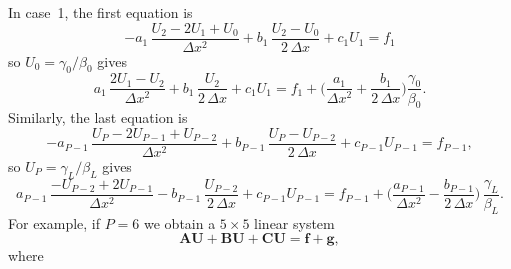 In case~1, the first equation is
\[
-a_1\,\frac{U_2-2U_1+U_0}{\Delta x^2}+b_1\,\frac{U_2-U_0}{2\,\Delta x}
	+c_1U_1=f_1
\]
so $U_0=\gamma_0/\beta_0$ gives
\[
a_1\,\frac{2U_1-U_2}{\Delta x^2}+b_1\,\frac{U_2}{2\,\Delta x}+c_1U_1
	=f_1+\biggl(\frac{a_1}{\Delta x^2}+\frac{b_1}{2\,\Delta x}\biggr)
	\frac{\gamma_0}{\beta_0}.
\]
Similarly, the last equation is
\[
-a_{P-1}\,\frac{U_P-2U_{P-1}+U_{P-2}}{\Delta x^2}
	+b_{P-1}\,\frac{U_P-U_{P-2}}{2\,\Delta x}+c_{P-1}U_{P-1}=f_{P-1},
\]
so $U_P=\gamma_L/\beta_L$ gives
\[
a_{P-1}\,\frac{-U_{P-2}+2U_{P-1}}{\Delta x^2}
	-b_{P-1}\,\frac{U_{P-2}}{2\,\Delta x}+c_{P-1}U_{P-1}
	=f_{P-1}+\biggl(\frac{a_{P-1}}{\Delta x^2}-\frac{b_{P-1}}{2\,\Delta x}
	\biggr)\,\frac{\gamma_L}{\beta_L}.
\]
For example, if $P=6$ we obtain a $5\times5$ linear system
\begin{equation}\label{eq: finite diff matrix 1d}
\boldsymbol{A}\boldsymbol{U}+\boldsymbol{B}\boldsymbol{U}
	+\boldsymbol{C}\boldsymbol{U}=\boldsymbol{f}+\boldsymbol{g},
\end{equation}
where
